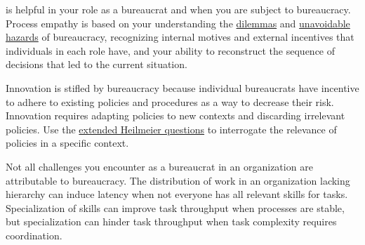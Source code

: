 \iftoggle{glossarysubstitutionworks}{\Gls{process empathy}}{Process empathy} 
is helpful in your role as a bureaucrat and when you are subject to bureaucracy. 
Process empathy is based on your understanding the \hyperref[sec:dilemma-trilemma]{dilemmas} and \hyperref[sec:unavoidable-hazards]{unavoidable hazards} of bureaucracy, recognizing internal \gls{motives} and external \gls{incentives} that individuals in each role have, and your ability to reconstruct the sequence of decisions that led to the current situation. 


Innovation is stifled by bureaucracy
\iftoggle{haspagenumbers}{(see page~\pageref{sec:innovation})}{} because individual bureaucrats have incentive to adhere to existing policies and procedures as a way to decrease their risk. Innovation requires adapting policies to new contexts and discarding irrelevant policies. 
Use the \hyperref[sec:extending-Heilmeier]{extended Heilmeier questions}
\iftoggle{haspagenumbers}{(see page~\pageref{sec:extending-Heilmeier})}{} to interrogate the relevance of policies in a specific context.


Not all challenges you encounter as a bureaucrat in an organization are attributable to bureaucracy. The distribution of work in an organization lacking hierarchy can induce latency when not everyone has all relevant skills for tasks. Specialization of skills can improve task throughput when processes are stable, but specialization can hinder task throughput when task complexity requires coordination.

